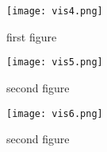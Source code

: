 \begin{figure}
	\centering
    \begin{minipage}{0.45\textwidth}
        \centering
        \texttt{[image: vis4.png]} %
        \caption{first figure}
    \end{minipage}\hfill
    \begin{minipage}{0.45\textwidth}
        \centering
        \texttt{[image: vis5.png]} %
        \caption{second figure}
    \end{minipage}\hfill
    \begin{minipage}{0.45\textwidth}
        \centering
        \texttt{[image: vis6.png]} %
        \caption{second figure}
    \end{minipage}
\end{figure}